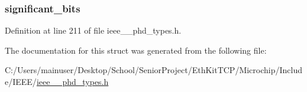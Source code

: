 \subsubsection[{significant\+\_\+bits}]{ significant\+\_\+bits}\label{struct___sample_type_a5c2d9d3038349b3667511c0756fd663d}


Definition at line 211 of file ieee\+\_\+\_\+phd\+\_\+types.\+h.



The documentation for this struct was generated from the following file\+:\begin{DoxyCompactItemize}
\item 
C\+:/\+Users/mainuser/\+Desktop/\+School/\+Senior\+Project/\+Eth\+Kit\+T\+C\+P/\+Microchip/\+Include/\+I\+E\+E\+E/\hyperlink{ieee__11073__phd__types_8h}{ieee\+\_\+\_\+phd\+\_\+types.\+h}\end{DoxyCompactItemize}
